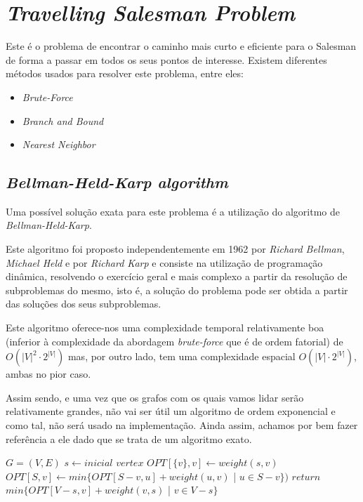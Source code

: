 \documentclass[12pt,a4paper]{report}
\begin{document}
	
	\section{\textit{Travelling Salesman Problem}}
	\label{perspetivas:tsp}
	Este é o problema de encontrar o caminho mais curto e eficiente para o Salesman de forma a passar em todos os seus pontos de interesse. Existem diferentes métodos usados para resolver este problema, entre eles:
	\begin{itemize}
		\item \textit{Brute-Force}
		\item \textit{Branch and Bound}
		\item \textit{Nearest Neighbor}
	\end{itemize}

		\subsection{\textit{Bellman-Held-Karp algorithm}}
		\label{algo:bellmanheldkarp}
		Uma possível solução exata para este problema é a utilização do algoritmo de \textit{Bellman-Held-Karp}. \par
		Este algoritmo foi proposto independentemente em 1962 por \textit{Richard Bellman}, \textit{Michael Held} e por \textit{Richard Karp} e consiste na utilização de programação dinâmica, resolvendo o exercício geral e mais complexo a partir da resolução de subproblemas do mesmo, isto é, a solução do problema pode ser obtida a partir das soluções dos seus subproblemas. \par
		Este algoritmo oferece-nos uma complexidade temporal relativamente boa (inferior à complexidade da abordagem \textit{brute-force} que é de ordem fatorial) de \( O(|V|^2 \cdot 2^{|V|})\) mas, por outro lado, tem uma complexidade espacial \( O(|V| \cdot 2^{|V|})\), ambas no pior caso. \cite{bellmanheldkarp} \par
		Assim sendo, e uma vez que os grafos com os quais vamos lidar serão relativamente grandes, não vai ser útil um algoritmo de ordem exponencial e como tal, não será usado na implementação. Ainda assim, achamos por bem fazer referência a ele dado que se trata de um algoritmo exato.

		\begin{center}
			\begin{algorithmic}[1]
				\State $G = (V, E)$
				\newline
				\State $s \leftarrow inicial$ $vertex$
					\State $OPT[\{v\}, v] \leftarrow weight(s,v)$
				\EndFor
							\State $ OPT[S,v] \leftarrow min\{OPT[S - v, u] + weight(u, v)$ | $u \in S - v \})$
						\EndFor
					\EndFor
				\EndFor
				\State $return$ $min\{ OPT[V - s, v] + weight(v, s)$ | $v \in V - s \} $
				\EndFunction
			\end{algorithmic}
		\end{center}
\end{document}
